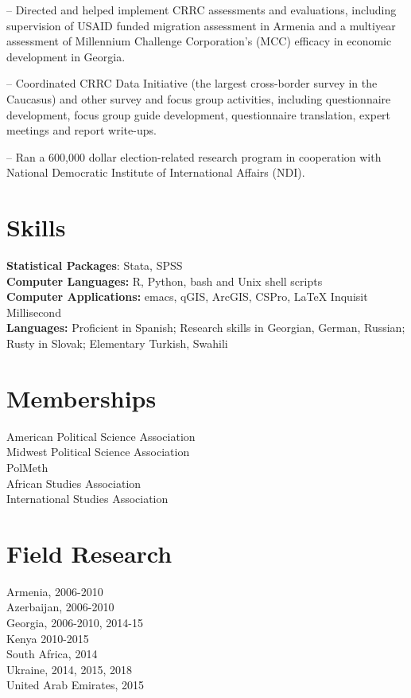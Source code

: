 \documentclass[margin,line]{res}
\newenvironment{list1}{
  \begin{list}{\ding{113}}{%
      \setlength{\itemsep}{0in}
      \setlength{\parsep}{0in} \setlength{\parskip}{0in}
      \setlength{\topsep}{0in} \setlength{\partopsep}{0in} 
      \setlength{\leftmargin}{0.17in}}}{\end{list}}
\begin{document}
{\begin{resume}
\vspace{-.3cm}
\begin{list1} 
\item[]-- Directed and helped implement CRRC assessments and evaluations,
  including supervision of USAID funded migration assessment in
  Armenia and a multiyear assessment of Millennium Challenge
  Corporation's (MCC) efficacy in economic development in
  Georgia. 
\item[]-- Coordinated CRRC Data Initiative (the largest cross-border
  survey in the Caucasus) and other survey and focus group activities,
  including questionnaire development, focus group guide development,
  questionnaire translation, expert meetings and report write-ups. 
\item[]-- Ran a 600,000 dollar election-related research program in
  cooperation with National Democratic Institute of International
  Affairs (NDI).
\end{list1}



\section{\sc Skills} 
\textbf{Statistical Packages}:  Stata, SPSS \\
\textbf{Computer Languages:} R, Python, bash and Unix shell scripts \\
\textbf{Computer Applications:} emacs, qGIS, ArcGIS, CSPro,  \LaTeX
Inquisit Millisecond \\
\textbf{Languages:} Proficient in Spanish; Research skills in
  Georgian, German, Russian; Rusty in Slovak; Elementary Turkish,
  Swahili \\

\section{\sc Memberships}
American Political Science Association \\
Midwest Political Science Association\\
PolMeth\\
African Studies Association\\
International Studies Association

\section{\sc Field Research}
Armenia, 2006-2010  \\
Azerbaijan, 2006-2010\\
Georgia, 2006-2010, 2014-15 \\
Kenya 2010-2015 \\
South Africa, 2014 \\
Ukraine, 2014, 2015, 2018 \\
United Arab Emirates, 2015 \\



\end{resume}}
\end{document}
